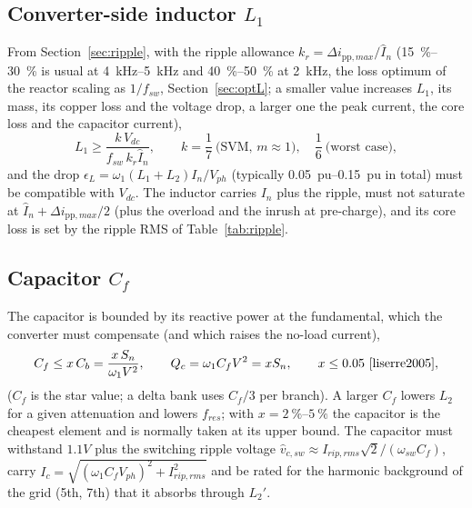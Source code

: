 \documentclass[10pt,a4paper]{scrartcl}
\newcommand{\Vdc}{V_{dc}}
\newcommand{\fsw}{f_{sw}}
\newcommand{\wsw}{\omega_{sw}}
\newcommand{\fres}{f_{res}}
\newcommand{\Cf}{C_{f}}
\newcommand{\pp}{\mathrm{pp}}
\begin{document}
\begin{onehalfspace}
\subsection{Converter-side inductor $L_1$}
From Section~\ref{sec:ripple}, with the ripple allowance $k_r = \Delta i_{\pp,max}/\hat I_n$ (\SIrange{15}{30}{\percent} is usual at \SIrange{4}{5}{kHz} and \SIrange{40}{50}{\percent} at \SI{2}{kHz}, the loss optimum of the reactor scaling as $1/\fsw$, Section~\ref{sec:optL}; a smaller value increases $L_1$, its mass, its copper loss and the voltage drop, a larger one the peak current, the core loss and the capacitor current),
\begin{equation}
L_1 \ge \frac{k\,\Vdc}{\fsw\,k_r \hat I_n},\qquad k = \frac{1}{7}\ \text{(SVM, } m \approx 1),\quad \frac16\ \text{(worst case)},
\label{eq:L1}
\end{equation}
and the drop $\epsilon_L = \omega_1 (L_1 + L_2) I_n / V_{ph}$ (typically \SIrange{0.05}{0.15}{pu} in total) must be compatible with $\Vdc$. The inductor carries $I_n$ plus the ripple, must not saturate at $\hat I_n + \Delta i_{\pp,max}/2$ (plus the overload and the inrush at pre-charge), and its core loss is set by the ripple RMS of Table~\ref{tab:ripple}.

\subsection{Capacitor $\Cf$}
The capacitor is bounded by its reactive power at the fundamental, which the converter must compensate (and which raises the no-load current),
\begin{equation}
\Cf \le x\,C_b = \frac{x\,S_n}{\omega_1 V^2},\qquad Q_c = \omega_1 \Cf V^2 = x S_n,\qquad x \le 0.05\ \text{\cite{liserre2005}},
\label{eq:Cf}
\end{equation}
($\Cf$ is the star value; a delta bank uses $\Cf/3$ per branch). A larger $\Cf$ lowers $L_2$ for a given attenuation and lowers $\fres$; with $x = \SIrange{2}{5}{\percent}$ the capacitor is the cheapest element and is normally taken at its upper bound. The capacitor must withstand $1.1 V$ plus the switching ripple voltage $\hat v_{c,sw} \approx I_{rip,rms}\sqrt2/(\wsw\Cf)$, carry $I_{c} = \sqrt{(\omega_1 \Cf V_{ph})^2 + I_{rip,rms}^2}$ and be rated for the harmonic background of the grid (5th, 7th) that it absorbs through $L_2'$.


\end{onehalfspace}
\end{document}
